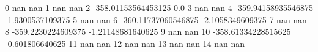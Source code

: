 0 nan nan
1 nan nan
2 -358.01153564453125 0.0
3 nan nan
4 -359.94158935546875 -1.9300537109375
5 nan nan
6 -360.11737060546875 -2.1058349609375
7 nan nan
8 -359.2230224609375 -1.21148681640625
9 nan nan
10 -358.61334228515625 -0.601806640625
11 nan nan
12 nan nan
13 nan nan
14 nan nan
